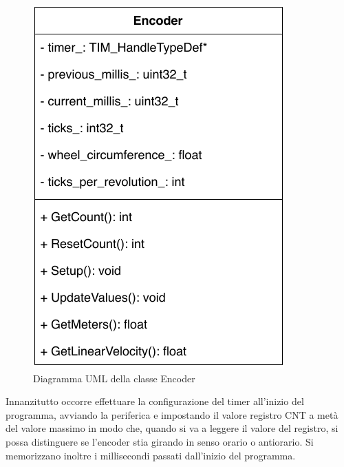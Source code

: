 \begin{figure}[htb]
    \centering
    \includegraphics[scale=0.80]{images/encoder_class.pdf}
    \caption{Diagramma UML della classe Encoder}
    \label{fig:encoder_class}
\end{figure}

Innanzitutto occorre effettuare la configurazione del timer all'inizio del programma, avviando la periferica e impostando il valore registro CNT a metà del valore massimo in modo che, quando si va a leggere il valore del registro, si possa distinguere se l'encoder stia girando in senso orario o antiorario. Si memorizzano inoltre i millisecondi passati dall'inizio del programma.

